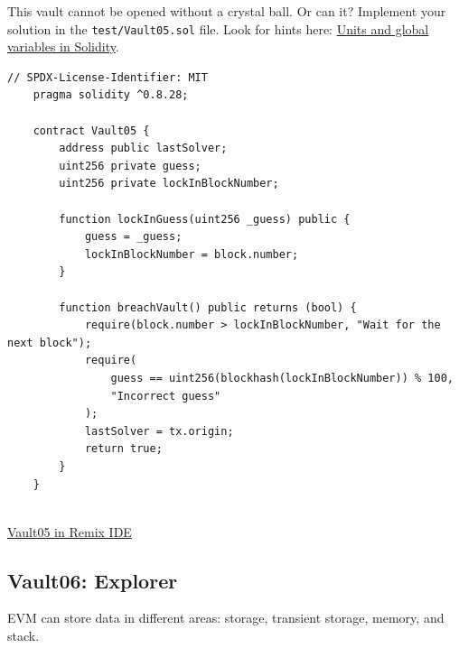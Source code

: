 \documentclass[12pt]{article}
\begin{document}
This vault cannot be opened without a crystal ball. Or can it? Implement your solution in the \texttt{test/Vault05.sol} file. Look for hints here: \href{https://docs.soliditylang.org/en/latest/units-and-global-variables.html}{Units and global variables in Solidity}.

\begin{lstlisting}[language=Solidity]
    // SPDX-License-Identifier: MIT
    pragma solidity ^0.8.28;
    
    contract Vault05 {
        address public lastSolver;
        uint256 private guess;
        uint256 private lockInBlockNumber;
    
        function lockInGuess(uint256 _guess) public {
            guess = _guess;
            lockInBlockNumber = block.number;
        }
    
        function breachVault() public returns (bool) {
            require(block.number > lockInBlockNumber, "Wait for the next block");
            require(
                guess == uint256(blockhash(lockInBlockNumber)) % 100,
                "Incorrect guess"
            );
            lastSolver = tx.origin;
            return true;
        }
    }
    
\end{lstlisting}

\medskip
\noindent
\href{https://remix.ethereum.org/?#activate=solidity&url=https://github.com/radovluk/unbreakable-vault/contracts/Vault05.sol&lang=en&optimize=false&runs=200&evmVersion=null&version=soljson-v0.8.28+commit.7893614a.js}{Vault05 in Remix IDE}

\subsection*{Vault06: Explorer}

EVM can store data in different areas: storage, transient storage, memory, and stack.
\end{document}
